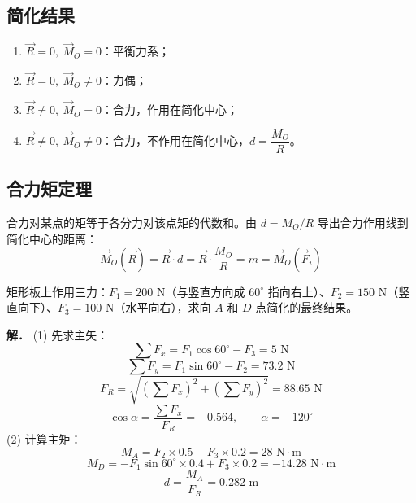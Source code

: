 \subsection{简化结果}

\begin{enumerate}
\item $\vec{R}=0,\ \vec{M}_O=0$：平衡力系；
\item $\vec{R}=0,\ \vec{M}_O\neq0$：力偶；
\item $\vec{R}\neq0,\ \vec{M}_O=0$：合力，作用在简化中心；
\item $\vec{R}\neq0,\ \vec{M}_O\neq0$：合力，不作用在简化中心，$d=\dfrac{M_O}{R}$。
\end{enumerate}

\subsection{合力矩定理}

 合力对某点的矩等于各分力对该点矩的代数和。由 $d=M_O/R$ 导出合力作用线到简化中心的距离：
\begin{equation}
\vec{M}_O(\vec{R})=\vec{R}\cdot d=\vec{R}\cdot\frac{M_O}{R}=m=\vec{M}_O(\vec{F}_i)
\label{eq:2-简化-合力矩}
\end{equation}

\begin{example}[简化问题的计算]
矩形板上作用三力：$F_1=200\text{ N}$（与竖直方向成 $60^\circ$ 指向右上）、$F_2=150\text{ N}$（竖直向下）、$F_3=100\text{ N}$（水平向右），求向 $A$ 和 $D$ 点简化的最终结果。

\textbf{解．}
(1) 先求主矢：
\begin{equation}
\sum F_x=F_1\cos60^\circ-F_3=5\text{ N}
\label{eq:2-例-简化-Σx}
\end{equation}
\begin{equation}
\sum F_y=F_1\sin60^\circ-F_2=73.2\text{ N}
\label{eq:2-例-简化-Σy}
\end{equation}
\begin{equation}
F_R=\sqrt{(\sum F_x)^2+(\sum F_y)^2}=88.65\text{ N}
\label{eq:2-例-简化-FR}
\end{equation}
\begin{equation}
\cos\alpha=\frac{\sum F_x}{F_R}=-0.564,\qquad \alpha=-120^\circ
\label{eq:2-例-简化-alpha}
\end{equation}
(2) 计算主矩：
\begin{equation}
M_A=F_2\times0.5-F_3\times0.2=28\text{ N}\cdot\text{m}
\label{eq:2-例-简化-MA}
\end{equation}
\begin{equation}
M_D=-F_1\sin60^\circ\times0.4+F_3\times0.2=-14.28\text{ N}\cdot\text{m}
\label{eq:2-例-简化-MD}
\end{equation}
\begin{equation}
d=\frac{M_A}{F_R}=0.282\text{ m}
\label{eq:2-例-简化-d}
\end{equation}
\end{example}

